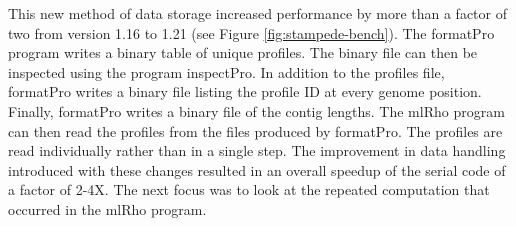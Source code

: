 \documentclass{sig-alternate}
\begin{document}
This new method of data storage increased performance by more than a factor of two from version
1.16 to 1.21 (see Figure \ref{fig:stampede-bench}). The formatPro program writes a binary table of unique
profiles.
The binary file can then be inspected using the program inspectPro.
In addition to the profiles file, formatPro writes a binary file
listing the profile ID at every genome position.
Finally, formatPro writes a binary file of the contig lengths.
The mlRho program can then read the profiles from the files produced by formatPro.
The profiles are read individually rather than in a single
step. %
 The improvement in data handling introduced with these changes resulted in an overall speedup of the
serial code of a factor of 2-4X. The next focus was to look at the repeated computation that occurred in the
mlRho program. 
\end{document}
